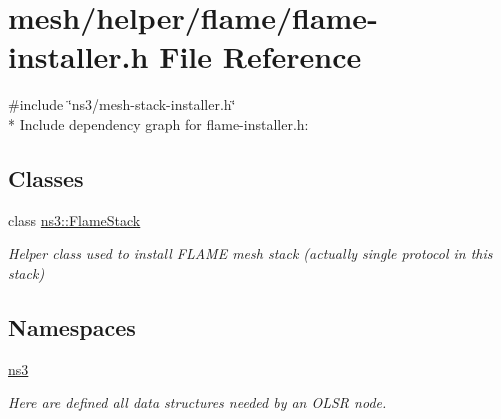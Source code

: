 \hypertarget{flame-installer_8h}{}\section{mesh/helper/flame/flame-\/installer.h File Reference}
\label{flame-installer_8h}
{\ttfamily \#include \char`\"{}ns3/mesh-\/stack-\/installer.\+h\char`\"{}}\\*
Include dependency graph for flame-\/installer.h\+:
\subsection*{Classes}
\begin{DoxyCompactItemize}
\item 
class \hyperlink{classns3_1_1FlameStack}{ns3\+::\+Flame\+Stack}
\begin{DoxyCompactList}\small\item\em Helper class used to install F\+L\+A\+ME mesh stack (actually single protocol in this stack) \end{DoxyCompactList}\end{DoxyCompactItemize}
\subsection*{Namespaces}
\begin{DoxyCompactItemize}
\item 
 \hyperlink{namespacens3}{ns3}
\begin{DoxyCompactList}\small\item\em Here are defined all data structures needed by an O\+L\+SR node. \end{DoxyCompactList}\end{DoxyCompactItemize}
